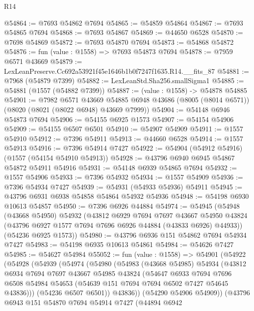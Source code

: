 \begin{lexlean}{R14}
\begin{coremodule}
@54864 := @7693 @54862 @7694
@54865 := @54859 @54864
@54867 := @7693 @54865 @7694
@54868 := @7693 @54867
@54869 := @44650 @6528
@54870 := @7698 @54869
@54872 := @7693 @54870 @7694
@54873 := @54868 @54872
@54876 := fun (value : @1558) => @7693 @54873 @7694
@54878 := @7959 @6571 @43669
@54879 := LexLeanPreserve.Cc692a53921f45e1646b1b0f7247f1635.R14.__fits_87
@54881 := @7968 (@54879 @7399)
@54882 := LexLeanStd.Sha256.smallSigma1
@54885 := @54881 (@1557 (@54882 @7399))
@54887 := (value : @1558) -> @54878 @54885
@54901 := @7982
    @6571
    @43669
    @54885
    @6948
    @43686
    (@8005 (@8014 @6571))
    (@8020 (@8021 (@8022 @6948) @43669 @7999))
@54904 := @54148 @6946 @54873 @7694
@54906 := @54155 @6925 @1573
@54907 := @54154 @54906
@54909 := @54155 @6507 @6501
@54910 := @54907 @54909
@54911 := @1557 @54910
@54912 := @7396 @54911
@54913 := @44660 @6528
@54914 := @1557 @54913
@54916 := @7396 @54914 @7427
@54922 := @54904 (@54912 @54916) (@1557 (@54154 @54910 @54913))
@54928 := @43796 @6940 @6945 @54867 @54872 @54911 @54916
@54931 := @54148 @6939 @54865 @7694
@54932 := @1557 @54906
@54933 := @7396 @54932
@54934 := @1557 @54909
@54936 := @7396 @54934 @7427
@54939 := @54931 (@54933 @54936) @54911
@54945 := @43796 @6931 @6938 @54858 @54864 @54932 @54936
@54948 := @54198 @6930 @10613 @54857
@54950 := @7396 @6926 @44884
@54974 := @54945
    (@54948
      (@43668 @54950)
      @54932
      (@43812
        @6929
        @7694
        @7697
        @43667
        @54950
        @43824
        (@43796 @6927 @1577 @7694 @7696 @6926 @44884 (@43833 @6926) @44933))
      (@54236 @6925 @1573))
@54980 := @43796 @6936 @151 @54862 @7694 @54934 @7427
@54983 := @54198 @6935 @10613 @54861
@54984 := @54626 @7427
@54985 := @54627 @54984
@55052 := fun (value : @1558) =>
  @54901
    (@54922
      (@54928
        (@54939
          (@54974
            (@54980
              (@54983
                (@43668 @54985)
                @54934
                (@43812
                  @6934
                  @7694
                  @7697
                  @43667
                  @54985
                  @43824
                  (@54647
                    @6933
                    @7694
                    @7696
                    @6508
                    @54984
                    @54653
                    (@54639 @151 @7694 @7694 @6502 @7427 @54645 @43836)))
                (@54236 @6507 @6501))
              @43836))
          (@54290 @54906 @54909))
        (@43796
          @6943
          @151
          @54870
          @7694
          @54914
          @7427
          (@44894
            @6942

\end{coremodule}
\end{lexlean}
